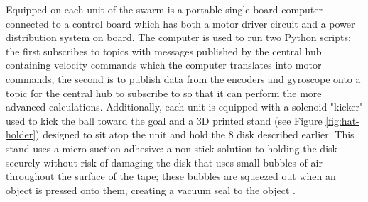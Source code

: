 \documentclass{article}
\begin{document}
     \par Equipped on each unit of the swarm is a portable single-board computer connected to a control board which has both a motor driver circuit and a power distribution system on board. The computer is used to run two Python scripts: the first subscribes to topics with messages published by the central hub containing velocity commands which the computer translates into motor commands, the second is to publish data from the encoders and gyroscope onto a topic for the central hub to subscribe to so that it can perform the more advanced calculations. Additionally, each unit is equipped with a solenoid "kicker" used to kick the ball toward the goal and a 3D printed stand (see Figure \ref{fig:hat-holder}) designed to sit atop the unit and hold the \SI{8}{\in} disk described earlier. This stand uses a micro-suction adhesive: a non-stick solution to holding the disk securely without risk of damaging the disk that uses small bubbles of air throughout the surface of the tape; these bubbles are squeezed out when an object is pressed onto them, creating a vacuum seal to the object \cite{Crawford17}.
\end{document}
